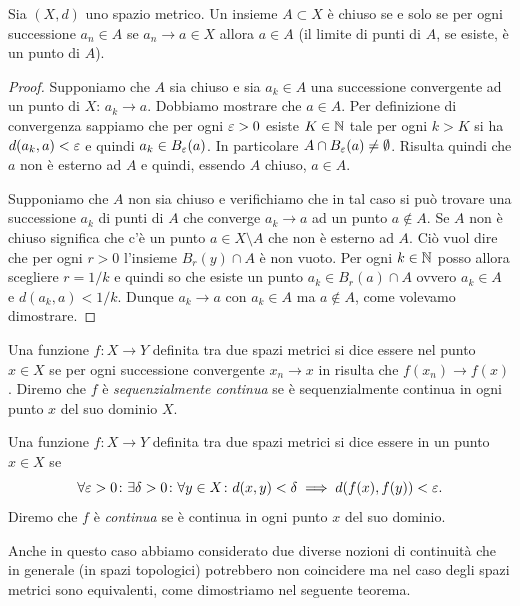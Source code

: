 \begin{theorem}
Sia $(X,d)$ uno spazio metrico.
Un insieme $A\subset X$ è chiuso se e solo se
per ogni successione $a_n\in A$ se $a_n\to a\in X$ allora $a \in A$
(il limite di punti di $A$, se esiste, è un punto di $A$).
\end{theorem}
%
\begin{proof}
Supponiamo che $A$ sia chiuso e sia
$a_k \in A$ una successione convergente ad un punto di $X$: $a_k \to a$.
Dobbiamo mostrare che $a\in A$.
Per definizione di convergenza
sappiamo che per ogni $\varepsilon>0$ esiste $K\in \mathbb N$ tale per ogni $k> K$
si ha $d(a_k,a)<\varepsilon$ e quindi $a_k \in B_\varepsilon(a)$.
In particolare $A \cap B_\varepsilon(a) \neq \emptyset$.
Risulta quindi che $a$ non è esterno ad $A$ e quindi, essendo $A$ chiuso, $a\in A$.

Supponiamo che $A$ non sia chiuso e verifichiamo che in tal caso
si può trovare una successione $a_k$ di punti di $A$ che converge $a_k\to a$
ad un punto $a\not\in A$.
Se $A$ non è chiuso significa che c'è un punto $a \in X\setminus A$ che non è esterno ad $A$.
Ciò vuol dire che per ogni $r>0$ l'insieme $B_r(y)\cap A$ è non vuoto. Per ogni $k\in \mathbb N$ posso allora
scegliere $r=1/k$ e quindi so che esiste un punto $a_k\in B_r(a) \cap A$ ovvero $a_k \in A$ e
$d(a_k,a) < 1/k$.
Dunque $a_k \to a$ con $a_k\in A$ ma $a\not \in A$, come volevamo dimostrare.
\end{proof}

\begin{definition}[continuità]
\mymark{**}
Una funzione $f\colon X \to Y$ definita tra due spazi metrici
si dice essere  nel punto $x\in X$ se
per ogni successione convergente $x_n \to x$ in risulta che $f(x_n)\to f(x)$.
Diremo che $f$ è \emph{sequenzialmente continua} se è sequenzialmente continua
in ogni punto $x$ del suo dominio $X$.

Una funzione $f\colon X \to Y$ definita tra due spazi metrici
si dice essere  in un punto $x\in X$ se
\begin{equation}\label{eq:continuita_metrico}
 \forall \varepsilon>0\colon \exists \delta>0\colon \forall y \in X \colon
 d(x,y)< \delta \implies d(f(x), f(y)) < \varepsilon.
\end{equation}
Diremo che $f$ è \emph{continua} se
è continua in ogni punto $x$ del suo dominio.
\end{definition}

Anche in questo caso abbiamo considerato due diverse nozioni di continuità che
in generale (in spazi topologici) potrebbero non coincidere ma nel caso degli
spazi metrici sono equivalenti, come dimostriamo nel seguente teorema.

